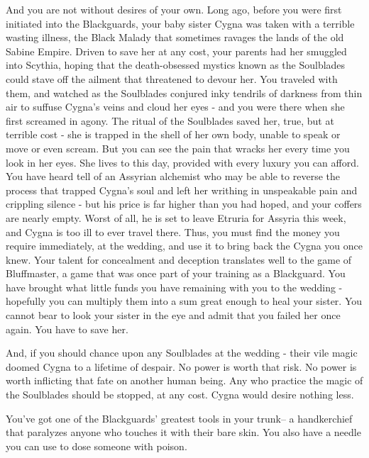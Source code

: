 \documentclass[char]{Kos}
\begin{document}
    And you are not without desires of your own. Long ago, before you were first initiated into the Blackguards, your baby sister Cygna was taken with a terrible wasting illness, the Black Malady that sometimes ravages the lands of the old Sabine Empire. Driven to save her at any cost, your parents had her smuggled into Scythia, hoping that the death-obsessed mystics known as the Soulblades could stave off the ailment that threatened to devour her. You traveled with them, and watched as the Soulblades conjured inky tendrils of darkness from thin air to suffuse Cygna's veins and cloud her eyes - and you were there when she first screamed in agony. The ritual of the Soulblades saved her, true, but at terrible cost - she is trapped in the shell of her own body, unable to speak or move or even scream. But you can see the pain that wracks her every time you look in her eyes. She lives to this day, provided with every luxury you can afford. You have heard tell of an Assyrian alchemist who may be able to reverse the process that trapped Cygna's soul and left her writhing in unspeakable pain and crippling silence - but his price is far higher than you had hoped, and your coffers are nearly empty. Worst of all, he is set to leave Etruria for Assyria this week, and Cygna is too ill to ever travel there. Thus, you must find the money you require immediately, at the wedding, and use it to bring back the Cygna you once knew. Your talent for concealment and deception translates well to the game of Bluffmaster, a game that was once part of your training as a Blackguard. You have brought what little funds you have remaining with you to the wedding - hopefully you can multiply them into a sum great enough to heal your sister. You cannot bear to look your sister in the eye and admit that you failed her once again. You have to save her.

    And, if you should chance upon any Soulblades at the wedding - their vile magic doomed Cygna to a lifetime of despair. No power is worth that risk. No power is worth inflicting that fate on another human being. Any who practice the magic of the Soulblades should be stopped, at any cost. Cygna would desire nothing less.
    
\begin{itemz}[Notes]
  \item You've got one of the Blackguards' greatest tools in your trunk-- a handkerchief that paralyzes anyone who touches it with their bare skin. You also have a needle you can use to dose someone with poison.
    \end{itemz}
\end{document}
